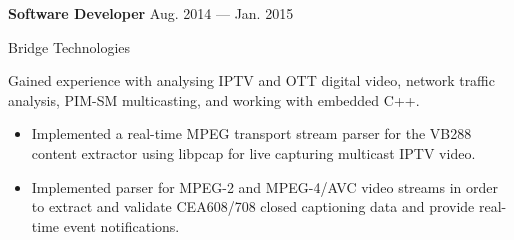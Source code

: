 \parbox[t][][t]{\linewidth}{
	\parbox{\linewidth}{\textbf{Software Developer}
		\hfill {{Aug. 2014 --- Jan. 2015}}}
		\smallbreak
	\parbox{\linewidth}{Bridge Technologies}

	\bigskip

	Gained experience with analysing IPTV and OTT digital video, network traffic analysis,
	PIM-SM multicasting, and working with embedded C++.

	\bigskip
	\begin{itemize}
		\item{Implemented a real-time MPEG transport stream parser for the VB288 content extractor using libpcap for live capturing
			multicast IPTV video.}\\[-.6em]
		\item{Implemented parser for MPEG-2 and MPEG-4/AVC video streams in order to extract and
			validate CEA608/708 closed captioning data and provide real-time event notifications.}

	\end{itemize}
	\bigskip
	\bigskip
}

